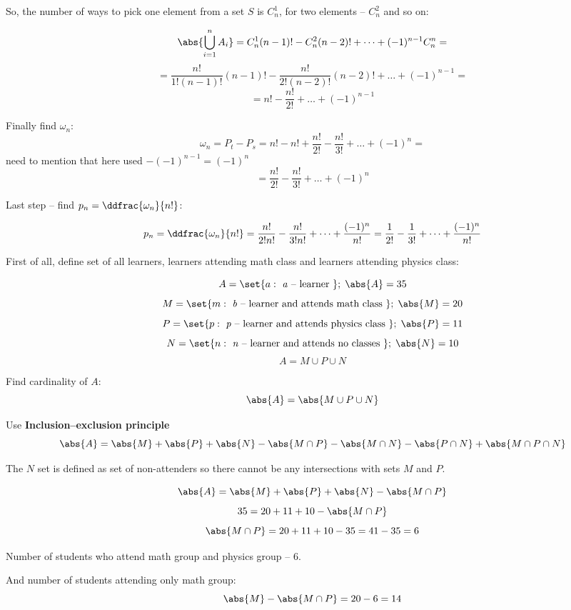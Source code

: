 So, the number of ways to pick one element from a set \(S\) is \( C_{n}^{1} \), for two elements --
\( C_{n}^{2} \) and so on:

\[ \abs{\bigcup_{i=1}^{n} A_i } = C_{n}^{1} (n-1)! - C_{n}^{2} (n-2)! + \dots + (-1)^{n-1}
    C_{n}^{n} = \]
\[ = \frac{n!}{1! (n-1)!} (n-1)! - \frac{n!}{2! (n-2)!} (n-2)! + \dots + (-1)^{n-1} = \]
\[ = n! - \frac{n!}{2!} + \dots + (-1)^{n-1} \]

Finally find \(\omega_n\):
\[ \omega_n = P_t - P_s = n! - n! + \frac{n!}{2!} - \frac{n!}{3!} + \dots + (-1)^{n} = \]
need to mention that here used \( - (-1)^{n-1} = (-1)^{n} \)
\[ = \frac{n!}{2!} - \frac{n!}{3!} + \dots + (-1)^{n} \]

Last step -- find \( p_n = \ddfrac{\omega_n}{n!} \):

\[ p_n = \ddfrac{\omega_n}{n!} = \frac{n!}{2! n!} - \frac{n!}{3! n!} + \dots + \frac{(-1)^{n}}{n!} =
\frac{1}{2!} - \frac{1}{3!} + \dots + \frac{(-1)^{n}}{n!} \]


\exercise[1.14]

First of all, define set of all learners, learners attending math class and 
learners attending physics class:

\[ A = \set{ a : \text{ \textit{a} -- learner } } ; \; \abs{A} = 35 \]
\[ M = \set{ m : \text{ \textit{b} -- learner and attends math class }} ; \; \abs{M} = 20 \]
\[ P = \set{ p : \text{ \textit{p} -- learner and attends physics class }}  ; \; \abs{P} = 11 \]
\[ N = \set{ n : \text{ \textit{n} -- learner and attends no classes } }; \; \abs{N} = 10 \]
\[ A = M \cup P \cup N \]

Find cardinality of \(A\):
\[ \abs{A} = \abs{M \cup P \cup N} \]

Use \textbf{Inclusion–exclusion principle}
\[ \abs{A} = \abs{M} + \abs{P} + \abs{N} - \abs{M \cap P} - \abs{M \cap N} 
- \abs{P \cap N} + \abs{M \cap P \cap N} \]

The \(N\) set is defined as set of non-attenders so there cannot be any intersections with sets
\(M\) and \(P\).

\[ \abs{A} = \abs{M} + \abs{P} + \abs{N} - \abs{M \cap P} \]
\[ 35 = 20 + 11 + 10 - \abs{M \cap P} \]
\[ \abs{M \cap P} = 20 + 11 + 10 - 35 = 41 - 35 = 6 \]

Number of students who attend math group and physics group -- 6.

And number of students attending only math group:
\[ \abs{M} - \abs{M \cap P} = 20 - 6 = 14 \]

